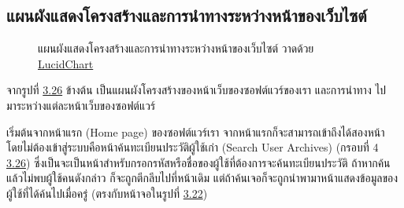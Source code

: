 \documentclass[12pt,oneside,openright,a4paper]{cpe-thai-project}
\begin{document}
    \subsection{แผนผังแสดงโครงสร้างและการนำทางระหว่างหน้าของเว็บไซต์}
        \hypertarget{nav-map}{
                \begin{figure}[!h]
                \centering
                    \caption[ภาพแผนผังแสดงโครงสร้างและการนำทางระหว่างหน้าของเว็บไซต์]{แผนผังแสดงโครงสร้างและการนำทางระหว่างหน้าของเว็บไซต์ วาดด้วย \href{https://lucid.app/}{LucidChart}}
                    \label{fig:nav-map}
                \end{figure}
            }
        \begin{flushleft}
        จากรูปที่ \hyperlink{nav-map}{3.26} ข้างต้น เป็นแผนผังโครงสร้างของหน้าเว็บของซอฟต์แวร์ของเรา และการนำทาง ไปมาระหว่างแต่ละหน้าเว็บของซอฟต์แวร์
        \end{flushleft}
        \begin{flushleft}
        เริ่มต้นจากหน้าแรก (Home page) ของซอฟต์แวร์เรา จากหน้าแรกก็จะสามารถเข้าถึงได้สองหน้า โดยไม่ต้องเข้าสู่ระบบคือหน้าค้นทะเบียนประวัติผู้ใช้เก่า (Search User Archives) (กรอบที่ 4 \hyperlink{nav-map}{3.26}) ซึ่งเป็นจะเป็นหน้าสำหรับกรอกรหัสหรือชื่อของผู้ใช้ที่ต้องการจะค้นทะเบียนประวัติ ถ้าหากค้นแล้วไม่พบผู้ใช้คนดังกล่าว ก็จะถูกตีกลีบไปที่หน้าเดิม แต่ถ้าค้นเจอก็จะถูกนำพามาหน้าแสดงข้อมูลของผู้ใช้ที่ได้ค้นไปเมื่อครู่ (ตรงกับหน้าจอในรูปที่ \hyperlink{ui-archive1}{3.22})
        \end{flushleft}
\end{document}
